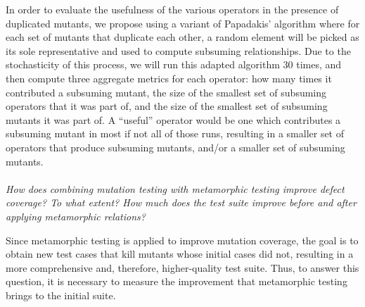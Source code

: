 In order to evaluate the usefulness of the various operators in the presence of duplicated mutants, we propose using a variant of Papadakis' algorithm where for each set of mutants that duplicate each other, a random element will be picked as its sole representative and used to compute subsuming relationships.
Due to the stochasticity of this process, we will run this adapted algorithm 30 times, and then compute three aggregate metrics for each operator: how many times it contributed a subsuming mutant, the size of the smallest set of subsuming operators that it was part of, and the size of the smallest set of subsuming mutants it was part of.
A ``useful'' operator would be one which contributes a subsuming mutant in most if not all of those runs, resulting in a smaller set of operators that produce subsuming mutants, and/or a smaller set of subsuming mutants.


\paragraph{\rqmetamorphic} \emph{How does combining mutation testing
  with metamorphic testing improve defect coverage? To what extent?
  How much does the test suite improve before and after applying
  metamorphic relations?}

Since metamorphic testing is applied to improve mutation coverage, the
goal is to obtain new test cases that kill mutants whose initial cases
did not, resulting in a more comprehensive and, therefore,
higher-quality test suite. Thus, to answer this question, it is
necessary to measure the improvement that metamorphic testing brings
to the initial suite.

